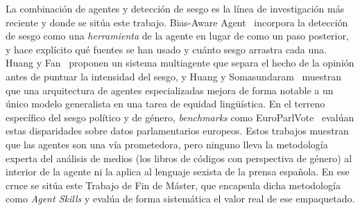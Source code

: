 La combinación de agentes y detección de sesgo es la línea de investigación más reciente y donde
se sitúa este trabajo. Bias-Aware Agent~\cite{singh2025biasaware} incorpora la
detección de sesgo como una \textit{herramienta} de la agente en lugar de como un
paso posterior, y hace explícito qué fuentes se han usado y cuánto sesgo arrastra
cada una. Huang y Fan~\cite{huang2025fairness} proponen un sistema multiagente que
separa el hecho de la opinión antes de puntuar la intensidad del sesgo, y Huang y
Somasundaram~\cite{huang2024queer} muestran que una arquitectura de agentes
especializadas mejora de forma notable a un único modelo generalista en una tarea
de equidad lingüística. En el terreno específico del sesgo político y de género,
\textit{benchmarks} como EuroParlVote~\cite{yang2025europarlvote} evalúan estas
disparidades sobre datos parlamentarios europeos. Estos trabajos muestran que las agentes son una vía prometedora, pero ninguno lleva
la metodología experta del análisis de medios (los libros de códigos con
perspectiva de género) al interior de la agente ni la aplica al lenguaje sexista de la
prensa española. En ese cruce se sitúa este Trabajo de Fin de Máster, que encapsula
dicha metodología como \textit{Agent Skills} y evalúa de forma sistemática el valor real
de ese empaquetado.

